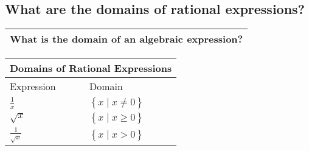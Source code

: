 \subsection{What are the domains of rational expressions?}

\begin{small}
    \begin{tabularx}{1\textwidth}{
            p{}
        }
        \toprule
        What is the domain of an algebraic expression?
        \\
        \bottomrule
    \end{tabularx}
\end{small}
\begin{small}
    \begin{tabularx}{1\textwidth}{
            p{}
            p{}
        }
        \toprule
        \multicolumn{2}{c}{\textbf{Domains of Rational Expressions}} \\
        \midrule

        Expression & Domain \\
        \midrule

        $ \frac{1}{x} $
        &
        $ \left\{x\mid x \neq 0 \right\} $
        \\
        \midrule

        $ \sqrt{x} $
        &
        $ \left\{x\mid x \geq 0 \right\} $
        \\
        \midrule

        $ \frac{1}{\sqrt{x}} $
        &
        $ \left\{x\mid x > 0 \right\} $
        \\
        \bottomrule
    \end{tabularx}

\end{small}
